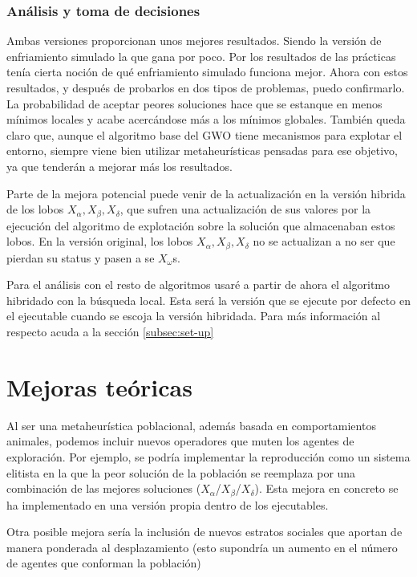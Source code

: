 \documentclass[a4paper, 12.5pt]{report}
\begin{document}
\subsubsection*{Análisis y toma de decisiones}
Ambas versiones proporcionan unos mejores resultados. Siendo la versión de enfriamiento simulado la que gana por poco. Por los resultados de las prácticas tenía cierta noción de qué enfriamiento simulado funciona mejor. Ahora con estos resultados, y después de probarlos en dos tipos de problemas, puedo confirmarlo. La probabilidad de aceptar peores soluciones hace que se estanque en menos mínimos locales y acabe acercándose más a los mínimos globales. También queda claro que, aunque el algoritmo base del GWO tiene mecanismos para explotar el entorno, siempre viene bien utilizar metaheurísticas pensadas para ese objetivo, ya que tenderán a mejorar más los resultados.

Parte de la mejora potencial puede venir de la actualización en la versión hibrida de los lobos $X_\alpha,X_\beta,X_\delta$, que sufren una actualización de sus valores por la ejecución del algoritmo de explotación sobre la solución que almacenaban estos lobos. En la versión original, los lobos $X_\alpha,X_\beta,X_\delta$ no se actualizan a no ser que pierdan su status y pasen a se $X_\omega$s.

Para el análisis con el resto de algoritmos usaré a partir de ahora el algoritmo hibridado con la búsqueda local. Esta será la versión que se ejecute por defecto en el ejecutable cuando se escoja la versión hibridada. Para más información al respecto acuda a la sección \ref{subsec:set-up}



\section{Mejoras teóricas}
Al ser una metaheurística poblacional, además basada en comportamientos animales, podemos incluir nuevos operadores que muten los agentes de exploración. Por ejemplo, se podría implementar la reproducción como un sistema elitista en la que la peor solución de la población se reemplaza por una combinación de las mejores soluciones ($X_\alpha$/$X_\beta$/$X_\delta$). Esta mejora en concreto se ha implementado en una versión propia dentro de los ejecutables.


Otra posible mejora sería la inclusión de nuevos estratos sociales que aportan de manera ponderada al desplazamiento (esto supondría un aumento en el número de agentes que conforman la población)
\end{document}

